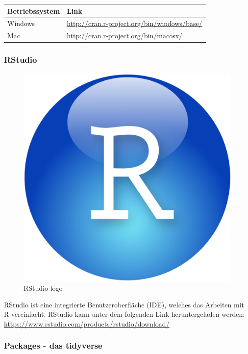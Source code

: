 \documentclass[
]{article}
\begin{document}
\begin{longtable}[]{@{}ll@{}}
\toprule
Betriebssystem & Link \\
\midrule
\endhead
Windows & \url{http://cran.r-project.org/bin/windows/base/} \\
Mac & \url{http://cran.r-project.org/bin/macosx/} \\
\bottomrule
\end{longtable}

\hypertarget{rstudio}{%
\subsubsection{RStudio}\label{rstudio}}

\begin{figure}

{\centering \includegraphics[width=0.5\linewidth]{images/005} 

}

\caption{RStudio logo}\label{fig:unnamed-chunk-8}
\end{figure}

RStudio ist eine integrierte Benutzeroberfläche (IDE), welches das Arbeiten mit R vereinfacht. RStudio kann unter dem folgenden Link heruntergeladen werden: \url{https://www.rstudio.com/products/rstudio/download/}

\hypertarget{packages---das-tidyverse}{%
\subsubsection{Packages - das tidyverse}\label{packages---das-tidyverse}}
\end{document}

